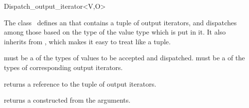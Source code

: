 \begin{ccRefClass}{Dispatch_output_iterator<V,O>}


  \ccDefinition The class \ccClassTemplateName\ defines an
   that contains a tuple of output iterators, and dispatches
  among those based on the type of the value type which is put in it.
  It also inherits from , which makes it easy to treat like a tuple.

  \ccParameters
   must be a  of the types of values to be accepted and dispatched.
   must be a  of the types of corresponding output iterators.


  \ccIsModel

  \ccInheritsFrom {}

  \ccTypes

  \ccGlue

  \ccCreation



  {returns a reference to the tuple of output iterators.}

  {returns a  constructed from the arguments.}

  \ccSeeAlso

\end{ccRefClass}


